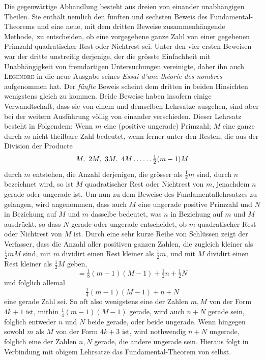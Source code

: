 Die gegenwärtige Abhandlung besteht aus dreien von einander unabhängigen Theilen. Sie enthält nemlich den fünften und sechsten Beweis des Fundamental-Theorems und eine neue, mit dem dritten Beweise zusammenhängende Methode,\textperiodcentered\ zu entscheiden, ob eine vorgegebene ganze Zahl von einer gegebenen Primzahl quadratischer Rest oder Nichtrest sei. Unter den vier ersten Beweisen war der dritte unstreitig derjenige, der die grösste Einfachheit mit Unabhängigkeit von fremdartigen Untersuchungen vereinigte, daher ihn auch \textsc{Legendre} in die neue Ausgabe seines \emph{Essai d'une théorie des nombres} aufgenommen hat. Der \emph{fünfte} Beweis scheint dem dritten in beiden Hinsichten wenigstens gleich zu kommen. Beide Beweise haben insofern einige Verwandtschaft, dass sie von einem und demselben Lehrsatze ausgehen, sind aber bei der weitern Ausführung völlig von %
einander verschieden. Dieser Lehrsatz besteht in Folgendem: Wenn $m$ eine (positive ungerade) Primzahl; $M$ eine ganze durch $m$ nicht theilbare Zahl bedeutet, wenn ferner unter den Resten, die aus der Division der Producte
\[
M,\ 2M,\ 3M,\ 4M\mathinner{.\,.\,.\,.\,.\,.}\tfrac12(m-1)M
\]
durch $m$ entstehen, die Anzahl derjenigen, die grösser als $\frac12m$ sind, durch $n$ bezeichnet wird, so ist $M$ quadratischer Rest oder Nichtrest von $m$, jenachdem $n$ gerade oder ungerade ist. Um nun zu dem Beweise des Fundamentallehrsatzes zu gelangen, wird angenommen, dass auch $M$ eine ungerade positive Primzahl und $N$ in Beziehung auf $M$ und $m$ dasselbe bedeutet, was $n$ in Beziehung auf $m$ und $M$ ausdrückt, so dass $N$ gerade oder ungerade entscheidet, ob $m$ quadratischer Rest oder Nichtrest von $M$ ist. Durch eine sehr kurze Reihe von Schlüssen zeigt der Verfasser, dass die Anzahl aller positiven ganzen Zahlen, die zugleich kleiner als $\frac12mM$ sind, mit $m$ dividirt einen Rest kleiner als $\frac12m$, und mit $M$ dividirt einen Rest kleiner als $\frac12M$ geben,
\[
=\tfrac18(m-1)(M-1)+\tfrac12n+\tfrac12N
\]
und folglich allemal
\[
\tfrac14(m-1)(M-1)+n+N
\]
eine gerade Zahl sei. So oft also wenigstens eine der Zahlen $m,M$ von der Form $4k+1$ ist, mithin $\frac14(m-1)(M-1)$ gerade, wird auch $n+N$ gerade sein, folglich entweder $n$ und $N$ beide gerade, oder beide ungerade. Wenn hingegen sowohl $m$ als $M$ von der Form $4k+3$ ist, wird nothwendig $n+N$ ungerade, folglich eine der Zahlen $n,N$ gerade, die andere ungerade sein. Hieraus folgt in Verbindung mit obigem Lehrsatze das Fundamental-Theorem von selbst.

